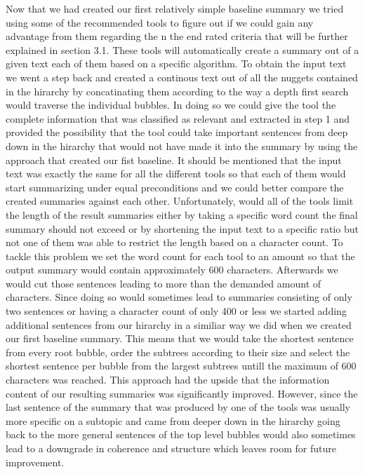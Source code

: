 Now that we had created our first relatively simple baseline summary we tried using some of the recommended tools to figure out if we could gain any advantage from them regarding the n the end rated criteria that will be further explained in section 3.1. These tools will automatically create a summary out of a given text each of them based on a specific algorithm. To obtain the input text we went a step back and created a continous text out of all the nuggets contained in the hirarchy by concatinating them according to the way a depth first search would traverse the individual bubbles. In doing so we could give the tool the complete information that was classified as relevant and extracted in step 1 and provided the possibility that the tool could take important sentences from deep down in the hirarchy that would not have made it into the summary by using the approach that created our fist baseline. It should be mentioned that the input text was exactly the same for all the different tools so that each of them would start summarizing under equal preconditions and we could better compare the created summaries against each other. Unfortunately, would all of the tools limit the length of the result summaries either by taking a specific word count the final summary should not exceed or by shortening the input text to a specific ratio but not one of them was able to restrict the length based on a character count. To tackle this problem we set the word count for each tool to an amount so that the output summary would contain approximately 600 characters. Afterwards we would cut those sentences leading to more than the demanded amount of characters. Since doing so would sometimes lead to summaries consisting of only two sentences or having a character count of only 400 or less we started adding additional sentences from our hirarchy in a similiar way we did when we created our first baseline summary. This means that we would take the shortest sentence from every root bubble, order the subtrees according to their size and select the shortest sentence per bubble from the largest subtrees untill the maximum of 600 characters was reached. This approach had the upside that the information content of our resulting summaries was significantly improved. However, since the last sentence of the summary that was produced by one of the tools was usually more specific on a subtopic and came from deeper down in the hirarchy going back to the more general sentences of the top level bubbles would also sometimes lead to a downgrade in coherence and structure which leaves room for future improvement.  

